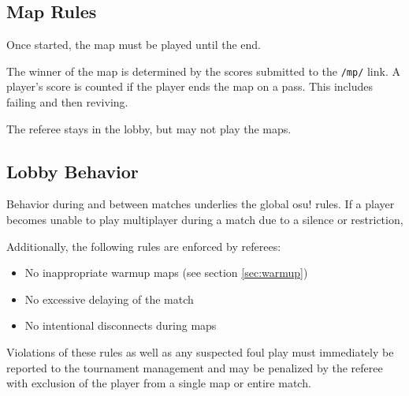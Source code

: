 
\subsection{Map Rules}

Once started, the map must be played until the end.

The winner of the map is determined by the scores submitted to the \texttt{/mp/} link. A player's score is counted if the player ends the map on a pass. This includes failing and then reviving.


The referee stays in the lobby, but may not play the maps.

\subsection{Lobby Behavior}

Behavior during and between matches underlies the global osu! rules. If a player becomes unable to play multiplayer during a match due to a silence or restriction, 

\begin{samepage}
Additionally, the following rules are enforced by referees:

\begin{itemize}
	\item No inappropriate warmup maps (see section \ref{sec:warmup})
	\item No excessive delaying of the match
	\item No intentional disconnects during maps
\end{itemize}
\end{samepage}

Violations of these rules as well as any suspected foul play must immediately be reported to the tournament management and may be penalized by the referee with exclusion of the player from a single map or entire match. 

